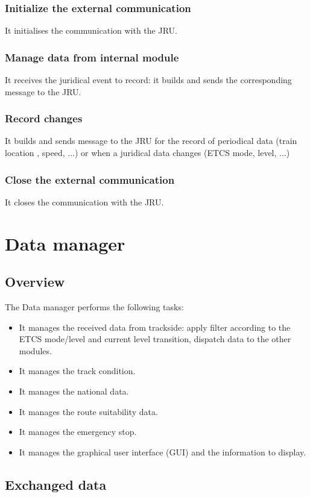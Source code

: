 \documentclass[nocc]{template/openetcs_report}
\begin{document}
\subsection{Initialize the external communication}
It initialises the communication with the JRU.
\subsection{Manage data from internal module}
It receives the juridical event to record: it builds and sends the corresponding message to the JRU.
\subsection{Record changes}
It builds and sends message to the JRU for the record of periodical data (train location , speed, ...) or when a juridical data changes (ETCS mode, level, ...)
\subsection{Close the external communication}
It closes the communication with the JRU.
\chapter{Data manager}
\section{Overview}
The Data manager performs the following tasks:
\begin{itemize}
\item	It manages the received data from trackside: apply filter according to the ETCS mode/level and current level transition, dispatch data to the other modules.
\item	It manages the track condition.
\item	It manages the national data.
\item	It manages the route suitability data.
\item	It manages the emergency stop.
\item	It manages the graphical user interface (GUI) and the information to display.
\end{itemize}

\section{Exchanged data}
\end{document}
